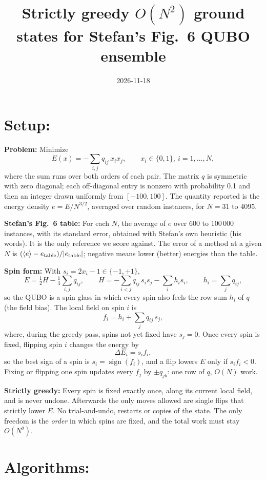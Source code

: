 \documentclass[11pt]{article}
\title{Strictly greedy $O(N^2)$ ground states for Stefan's Fig.~6 QUBO ensemble}
\author{}
\date{2026-11-18}
\begin{document}
\maketitle

\section*{Setup:}

\noindent\textbf{Problem:} Minimize
\[
  E(x) = -\sum_{i,j} q_{ij}\, x_i x_j, \qquad x_i \in \{0,1\},\ i = 1,\dots,N,
\]
where the sum runs over both orders of each pair. The matrix $q$ is symmetric with zero diagonal; each off-diagonal
entry is nonzero with probability 0.1 and then an integer drawn uniformly from $[-100, 100]$. The quantity reported is the
energy density $e = E/N^{3/2}$, averaged over random instances, for $N = 31$ to $4095$.

\noindent\textbf{Stefan's Fig.~6 table:} For each $N$, the average of $e$ over 600 to 100\,000 instances, with its
standard error, obtained with Stefan's own heuristic (his words). It is the only reference we score against. The
error of a method at a given $N$ is $(\langle e\rangle - e_{\rm table})/|e_{\rm table}|$; negative means lower
(better) energies than the table.

\noindent\textbf{Spin form:} With $s_i = 2x_i - 1 \in \{-1,+1\}$,
\[
  E = \tfrac12 H - \tfrac14 \sum_{i,j} q_{ij}, \qquad
  H = -\sum_{i<j} q_{ij}\, s_i s_j - \sum_i h_i s_i, \qquad h_i = \sum_j q_{ij},
\]
so the QUBO is a spin glass in which every spin also feels the row sum $h_i$ of $q$ (the field bias). The local field
on spin $i$ is
\[
  f_i = h_i + \sum_{j} q_{ij}\, s_j ,
\]
where, during the greedy pass, spins not yet fixed have $s_j = 0$. Once every spin is fixed, flipping spin $i$ changes
the energy by
\[
  \Delta E_i = s_i f_i ,
\]
so the best sign of a spin is $s_i = \operatorname{sign}(f_i)$, and a flip lowers $E$ only if $s_i f_i < 0$.
Fixing or flipping one spin updates every $f_j$ by $\pm q_{jb}$: one row of $q$, $O(N)$ work.

\noindent\textbf{Strictly greedy:} Every spin is fixed exactly once, along its current local field, and is never
undone. Afterwards the only moves allowed are single flips that strictly lower $E$. No trial-and-undo, restarts or
copies of the state. The only freedom is the \emph{order} in which spins are fixed, and the total work must stay
$O(N^2)$.

\section*{Algorithms:}
\end{document}
